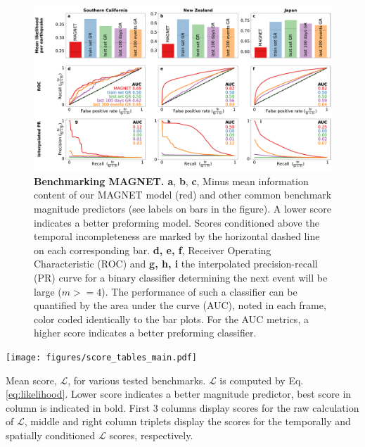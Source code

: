 \documentclass[pdflatex]{sn-jnl}
\begin{document}
\begin{figure}[h!]
    \centering
    \includegraphics[width=1\textwidth]{figures/combined_barplots.pdf}
    \caption{
        \textbf{Benchmarking MAGNET. a}, \textbf{b}, \textbf{c}, Minus mean information content of our MAGNET model (red) and other common benchmark magnitude predictors (see labels on bars in the figure). A lower score indicates a better preforming model. Scores conditioned above the temporal incompleteness are marked by the horizontal dashed line on each corresponding bar. \textbf{d, e, f}, Receiver Operating Characteristic (ROC) and \textbf{g, h, i} the interpolated precision-recall (PR) curve for a binary classifier determining the next event will be large ($m>=4$). The performance of such a classifier can be quantified by the area under the curve (AUC), noted in each frame, color coded identically to the bar plots. For the AUC metrics, a higher score indicates a better preforming classifier.
        }
        \label{fig:metrics}
\end{figure}


\begin{table}[h!]
    \centering
    \texttt{[image: figures/score\_tables\_main.pdf]}
    \caption{Mean score, $\mathcal{L}$, for various tested benchmarks. $\mathcal{L}$ is computed by Eq. \ref{eq:likelihood}. Lower score indicates a better magnitude predictor, best score in column is indicated in bold. First 3 columns display scores for the raw calculation of $\mathcal{L}$, middle and right column triplets display the scores for the temporally and spatially conditioned $\mathcal{L}$ scores, respectively.
    }
    \label{tab:mean_ll_benchmarks_main_text}
\end{table}
   
\end{document}
